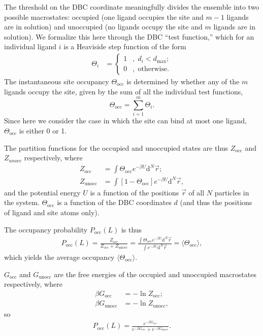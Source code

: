 \documentclass[9pt,tutorial]{Styling/livecoms}
\begin{document}
The threshold on the DBC coordinate meaningfully divides the ensemble into two possible macrostates: occupied (one ligand occupies the site and $m-1$ ligands are in solution) and unoccupied (no ligands occupy the site and $m$ ligands are in solution).  We formalize this here through the DBC ``test function,'' which for an individual ligand $i$ is a Heaviside step function  of the form 
\begin{align} \label{eq:test_fnc1}
   \Theta_i &= \begin{cases}
        1 &, \; d_{i} < d_\mathrm{max};\\
        0 &, \; \text{otherwise}.
    \end{cases}
\end{align}
The instantaneous site occupancy $\Theta_\mathrm{occ}$ is determined by whether any of the $m$ ligands occupy the site, given by the sum of all the individual test functions,
\begin{equation}\label{eq:test_fnc2}
   \Theta_\mathrm{occ}=\sum_{i=1}^m\Theta_i. 
\end{equation}
Since here we consider the case in which the site can bind at most one ligand, $\Theta_\mathrm{occ}$ is either 0 or 1.  

The  partition functions for the occupied and unoccupied states are thus $Z_\mathrm{occ}$ and $Z_{unocc}$ respectively, where 
\begin{align}
    Z_{\mathrm{occ}} &=\int \Theta_\mathrm{occ}e^{-\beta U} \mathrm{d}^N\vec{r};\label{eq:partition1}\\ 
    Z_{\mathrm{unocc}} &= \int \left[1-\Theta_\mathrm{occ}\right]e^{-\beta U} \mathrm{d}^N\vec{r} , \label{eq:partition2}
\end{align}
and the potential energy $U$ is a function of the positions $\vec{r}$ of all $N$ particles in the system. $\Theta_\mathrm{occ}$ is a function of the DBC coordinates $d$ (and thus the positions of ligand and site atoms only).  

The occupancy probability $P_\mathrm{occ}(L)$ is thus  
\begin{align}\label{eq:probability1.5}
    P_\mathrm{occ}(L)=\frac{Z_{\mathrm{occ}}} {Z_{\mathrm{occ}} + Z_{\mathrm{unocc}}}=\frac{\int \Theta_\mathrm{occ} e^{-\beta U} \mathrm{d}^N\vec{r}} {\int e^{-\beta U}\mathrm{d}^N\vec{r}}=\langle \Theta_\mathrm{occ}\rangle,
\end{align} 
which yields the average occupancy $\langle \Theta_\mathrm{occ}\rangle$.  

$G_\mathrm{occ}$ and $G_\mathrm{unocc}$ are the free energies of the occupied and unoccupied macrostates respectively, where
\begin{align}
    \beta G_\mathrm{occ}&=-\ln Z_\mathrm{occ};\\
    \beta G_\mathrm{unocc}&=-\ln Z_\mathrm{unocc},
\end{align}
 so 
\begin{align}
    P_\mathrm{occ}(L)=\frac{e^{-\beta G_\mathrm{occ}}} {e^{-\beta G_\mathrm{occ}} + e^{-\beta G_\mathrm{unocc}}}.\label{eq:ApE:probability2}
\end{align}
\end{document}
